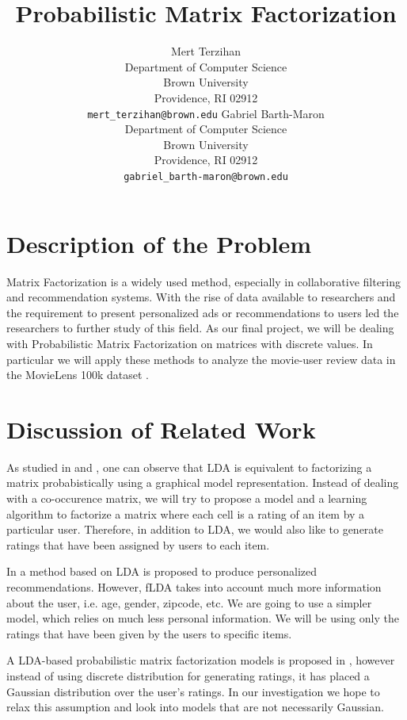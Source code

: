 \documentclass{article} %
\title{Probabilistic Matrix Factorization}
\author{ 
  Mert Terzihan \\
  Department of Computer Science\\
  Brown University\\
  Providence, RI 02912 \\
  \texttt{mert\_terzihan@brown.edu}
  \And
  Gabriel Barth-Maron \\
  Department of Computer Science \\
  Brown University \\
  Providence, RI 02912 \\
  \texttt{gabriel\_barth-maron@brown.edu}\\
}
\begin{document}
\maketitle

\section{Description of the Problem}
\label{desc}
Matrix Factorization is a widely used method, especially in collaborative 
filtering and recommendation systems. With the rise of data available to 
researchers and the requirement to present personalized ads or recommendations 
to users led the researchers to further study of this field. As our final 
project, we will be dealing with Probabilistic Matrix Factorization on 
matrices with discrete values. In particular we will apply these methods to analyze the movie-user review data in the MovieLens 100k dataset \cite{movielens100k}.


\section{Discussion of Related Work}
\label{work}
As studied in \cite{lda} and \cite{discrete-pca}, one can observe that LDA is equivalent to factorizing a matrix 
probabistically using a graphical model representation. Instead of dealing with 
a co-occurence matrix, we will try to propose a model and a learning algorithm to 
factorize a matrix where each cell is a rating of an item by a particular user. 
Therefore, in addition to LDA, we would also like to generate ratings that have been 
assigned by users to each item. 

In \cite{Argwal-fDLA} a method based on LDA is proposed to produce personalized recommendations.
However, fLDA takes into account much more information about the user, i.e. age, 
gender, zipcode, etc. We are going to use a simpler model, which relies on
much less personal information. We will be using only the ratings 
that have been given by the users to specific items.

A LDA-based probabilistic matrix factorization models is proposed in
\cite{conf/icdm/ShanB10}, however instead of using discrete distribution
for generating ratings, it has placed a Gaussian distribution over the user's
ratings. In our investigation we hope to relax this assumption and look into
models that are not necessarily Gaussian.
\end{document}
